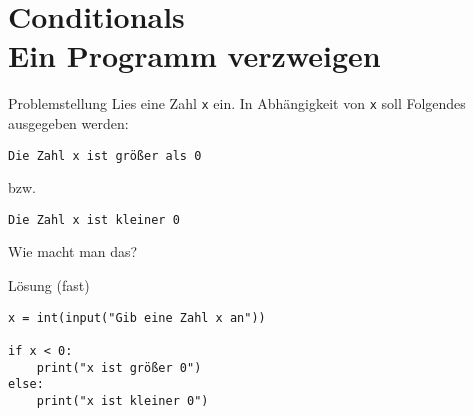 \documentclass[algorithm,pgfplots,colortheme=light]{cuzbeamer}
\newcommand{\py}[1]{\texttt{#1}}
\begin{document}

\maketitle






\section{Conditionals \\ \footnotesize Ein Programm verzweigen}

\begin{frame}
	\begin{block}{Problemstellung}
		\vspace{2pt}
		Lies eine Zahl \py{x} ein. In Abhängigkeit von \py{x} soll Folgendes ausgegeben werden: 
		
		\texttt{Die Zahl x ist größer als 0} 
		
		bzw. 
		
		\texttt{Die Zahl x ist kleiner 0}  
		\vspace{8pt}
		
		Wie macht man das?
		\end{block}
\end{frame}

\begin{fragile}
	
\begin{block}{Lösung \footnotesize(fast)}
\begin{verbatim}
x = int(input("Gib eine Zahl x an"))

if x < 0:
	print("x ist größer 0")
else:
	print("x ist kleiner 0")
\end{verbatim}
\end{block}
	
\end{fragile}
\end{document}
